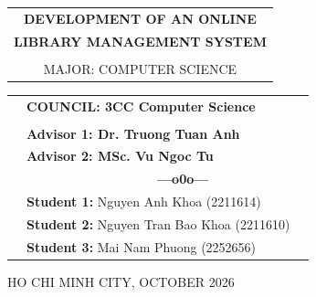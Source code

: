 \documentclass[a4paper]{article}
\theoremstyle{definition}
\begin{document}
\begin{titlepage}
\begin{center}
\begin{tabular}{c}
			\textbf{\LARGE DEVELOPMENT OF AN ONLINE }    \\
			\textbf{\LARGE LIBRARY MANAGEMENT SYSTEM}
			\\
			\\ \vspace{0.5cm} {\Large MAJOR: COMPUTER SCIENCE}
		\end{tabular}
	\end{center}
	\vspace{0.5cm}
	\begin{table}[h]
		\begin{tabular}{rll}
			\hspace{2.5 cm} & \textbf{\Large COUNCIL: 3CC Computer Science}
			\\[0.2cm]
			\\[0.2cm]
			\hspace{2.5 cm} & \textbf{\Large Advisor 1: Dr. Truong Tuan Anh}
			\\[0.2cm]
			\hspace{2.5 cm} & \textbf{\Large Advisor 2: MSc. Vu Ngoc Tu}
			\\[0.2cm]
			\hspace{4 cm} & \textbf{$\;$ $\;$$\;$$\;$$\;$$\;$$\;$$\;$$\;$$\;$$\;$$\;$$\;$$\;$$\;$$\;$$\;$$\;$$\;$$\;$$\;$$\;$$\;$$\;$$\;$$\;$$\;$$\;$$\;$$\;$$\;$$\;$$\;$$\;$ \Large ---o0o---}
			\\[0.2cm]
			\hspace{4 cm} & \textbf{\Large Student 1:} {\Large Nguyen Anh Khoa (2211614)}
			\\[0.2cm]
			\hspace{4 cm} & \textbf{\Large Student 2:}  {\Large Nguyen Tran Bao Khoa (2211610)}
			\\[0.2cm]
			\hspace{4 cm} & \textbf{\Large Student 3:}  {\Large Mai Nam Phuong (2252656)}
			\\[0.2cm]
		\end{tabular}
	\end{table}
	\vspace{0.5cm}
	\begin{center}
		{\Large HO CHI MINH CITY, OCTOBER 2026 }
	\end{center}
\end{titlepage}
\end{document}
